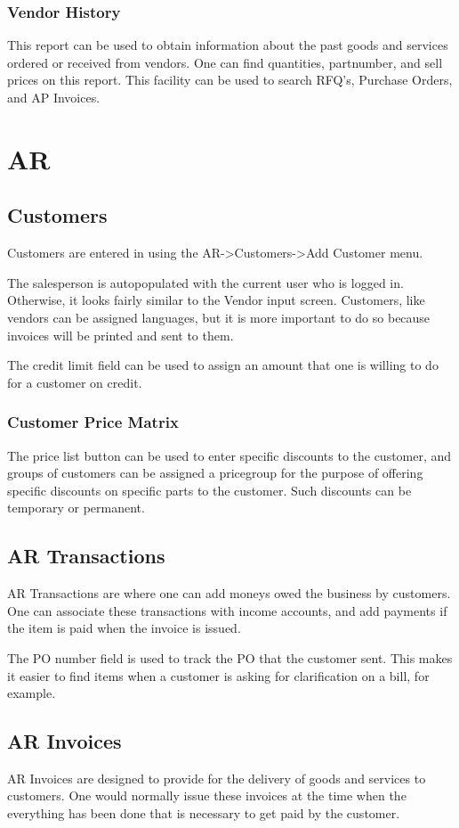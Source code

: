 \documentclass{article}
\begin{document}
\subsubsection{Vendor History}
This report can be used to obtain information about the past goods and services
ordered or received from vendors.  One can find quantities, partnumber, and 
sell prices on this report.  This facility can be used to search RFQ's, Purchase
Orders, and AP Invoices.

\section{AR}
\subsection{Customers}
Customers are entered in using the AR-\textgreater Customers-\textgreater Add Customer menu.

The salesperson is autopopulated with the current user who is logged in.
Otherwise, it looks fairly similar to the Vendor input screen.  Customers, like
vendors can be assigned languages, but it is more important to do so because
invoices will be printed and sent to them.

The credit limit field can be used to assign an amount that one is willing to do
for a customer on credit.

\subsubsection{Customer Price Matrix}
The price list button can be used to enter specific discounts to the customer,
and groups of customers can be assigned a pricegroup for the purpose of offering
specific discounts on specific parts to the customer.  Such discounts can be
temporary or permanent.

\subsection{AR Transactions}
AR Transactions are where one can add moneys owed the business by customers.
One can associate these transactions with income accounts, and add payments if
the item is paid when the invoice is issued.

The PO number field is used to track the PO that the customer sent.  This makes
it easier to find items when a customer is asking for clarification on a bill,
for example.

\subsection{AR Invoices}
AR Invoices are designed to provide for the delivery of goods and services to
customers.  One would normally issue these invoices at the time when the
everything has been done that is necessary to get paid by the customer.
\end{document}
